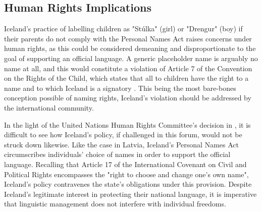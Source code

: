 \subsection{Human Rights Implications}

Iceland's practice of labelling children as "Stúlka" (girl) or "Drengur" (boy)
if their parents do not comply with the Personal Names Act raises concerns
under human rights, as this could be considered demeaning and disproportionate
to the goal of supporting an official language. A generic placeholder name is
arguably no name at all, and this would constitute a violation of Article 7 of
the Convention on the Rights of the Child, which states that all to children
have the right to a name and to which Iceland is a signatory \parencite{crc}.
This being the most bare-bones conception possible of naming rights, Iceland's
violation should be addressed by the international community.

In the light of the United Nations Human Rights Committee's decision in
\parencite{raihman10}, it is difficult to see how Iceland's policy, if
challenged in this forum, would not be struck down likewise. Like the case
in Latvia, Iceland's Personal Names Act circumscribes individuals' choice of
names in order to support the official language. Recalling that Article 17 of
the International Covenant on Civil and Political Rights encompasses the "right
to choose and change one's own name", Iceland's policy contravenes the state's
obligations under this provision. Despite Iceland's legitimate interest in
protecting their national language, it is imperative that linguistic management
does not interfere with individual freedoms.
